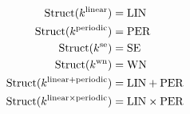 
\begin{align*}
\text{Struct}(k^\text{linear}) &= \text{LIN}\\
\text{Struct}(k^\text{periodic}) &= \text{PER}\\
\text{Struct}(k^\text{se}) &= \text{SE}\\
\text{Struct}(k^\text{wn}) &= \text{WN}\\
\text{Struct}(k^{\text{linear+periodic}}) &= \text{LIN}+\text{PER}\\
\text{Struct}(k^{\text{linear} \times \text{periodic}}) &= \text{LIN}
\times\text{PER}
\end{align*}


